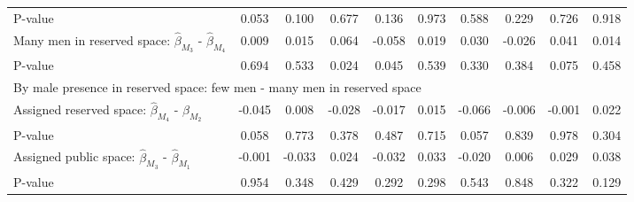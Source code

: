 \begin{tabular}{l*{9}{c}}
\quad P-value       &       0.053         &       0.100         &       0.677         &       0.136         &       0.973         &       0.588         &       0.229         &       0.726         &       0.918         \\
\quad Many men in reserved space: $\hat\beta_{M_3}$ - $\hat\beta_{M_4}$&       0.009         &       0.015         &       0.064         &      -0.058         &       0.019         &       0.030         &      -0.026         &       0.041         &       0.014         \\
\quad P-value       &       0.694         &       0.533         &       0.024         &       0.045         &       0.539         &       0.330         &       0.384         &       0.075         &       0.458         \\
\multicolumn{10}{l}{By male presence in reserved space: few men - many men in reserved space} \\ \quad Assigned reserved space: $\hat\beta_{M_4}$ - $\hat\beta_{M_2}$&      -0.045         &       0.008         &      -0.028         &      -0.017         &       0.015         &      -0.066         &      -0.006         &      -0.001         &       0.022         \\
\quad P-value       &       0.058         &       0.773         &       0.378         &       0.487         &       0.715         &       0.057         &       0.839         &       0.978         &       0.304         \\
\quad Assigned public space: $\hat\beta_{M_3}$ - $\hat\beta_{M_1}$&      -0.001         &      -0.033         &       0.024         &      -0.032         &       0.033         &      -0.020         &       0.006         &       0.029         &       0.038         \\
\quad P-value       &       0.954         &       0.348         &       0.429         &       0.292         &       0.298         &       0.543         &       0.848         &       0.322         &       0.129         \\
\hline\hline \end{tabular}
